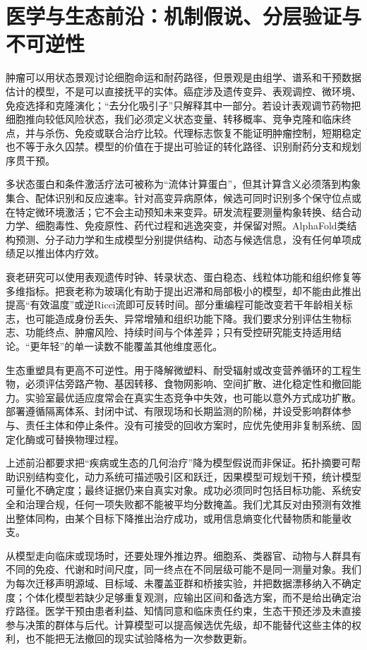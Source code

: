\section{医学与生态前沿：机制假说、分层验证与不可逆性}
\label{sec:tb_frontiers}

肿瘤可以用状态景观讨论细胞命运和耐药路径，但景观是由组学、谱系和干预数据估计的模型，不是可以直接抚平的实体。癌症涉及遗传变异、表观调控、微环境、免疫选择和克隆演化；“去分化吸引子”只解释其中一部分。若设计表观调节药物把细胞推向较低风险状态，我们必须定义状态变量、转移概率、竞争克隆和临床终点，并与杀伤、免疫或联合治疗比较。代理标志恢复不能证明肿瘤控制，短期稳定也不等于永久囚禁。模型的价值在于提出可验证的转化路径、识别耐药分支和规划序贯干预。

多状态蛋白和条件激活疗法可被称为“流体计算蛋白”，但其计算含义必须落到构象集合、配体识别和反应速率。针对高变异病原体，候选可同时识别多个保守位点或在特定微环境激活；它不会主动预知未来变异。研发流程要测量构象转换、结合动力学、细胞毒性、免疫原性、药代过程和逃逸突变，并保留对照。AlphaFold类结构预测、分子动力学和生成模型分别提供结构、动态与候选信息，没有任何单项成绩足以推出体内疗效。

衰老研究可以使用表观遗传时钟、转录状态、蛋白稳态、线粒体功能和组织修复等多维指标。把衰老称为玻璃化有助于提出迟滞和局部极小的模型，却不能由此推出提高“有效温度”或逆Ricci流即可反转时间。部分重编程可能改变若干年龄相关标志，也可能造成身份丢失、异常增殖和组织功能下降。我们要求分别评估生物标志、功能终点、肿瘤风险、持续时间与个体差异；只有受控研究能支持适用结论。“更年轻”的单一读数不能覆盖其他维度恶化。

生态重塑具有更高不可逆性。用于降解微塑料、耐受辐射或改变营养循环的工程生物，必须评估旁路产物、基因转移、食物网影响、空间扩散、进化稳定性和撤回能力。实验室最优适应度常会在真实生态竞争中失效，也可能以意外方式成功扩散。部署遵循隔离体系、封闭中试、有限现场和长期监测的阶梯，并设受影响群体参与、责任主体和停止条件。没有可接受的回收方案时，应优先使用非复制系统、固定化酶或可替换物理过程。

上述前沿都要求把“疾病或生态的几何治疗”降为模型假说而非保证。拓扑摘要可帮助识别结构变化，动力系统可描述吸引区和跃迁，因果模型可规划干预，统计模型可量化不确定度；最终证据仍来自真实对象。成功必须同时包括目标功能、系统安全和治理合规，任何一项失败都不能被平均分数掩盖。我们尤其反对由预测有效推出整体同构，由某个目标下降推出治疗成功，或用信息熵变化代替物质和能量收支。

从模型走向临床或现场时，还要处理外推边界。细胞系、类器官、动物与人群具有不同的免疫、代谢和时间尺度，同一终点在不同层级可能不是同一测量对象。我们为每次迁移声明源域、目标域、未覆盖亚群和桥接实验，并把数据漂移纳入不确定度；个体化模型若缺少足够重复观测，应输出区间和备选方案，而不是给出确定治疗路径。医学干预由患者利益、知情同意和临床责任约束，生态干预还涉及未直接参与决策的群体与后代。计算模型可以提高候选优先级，却不能替代这些主体的权利，也不能把无法撤回的现实试验降格为一次参数更新。

